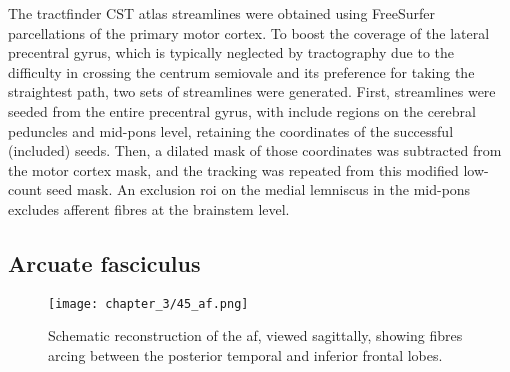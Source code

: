 The tractfinder CST atlas streamlines were obtained using FreeSurfer parcellations \autocite{Desikan2006,FischlSalat2002} of the primary motor cortex.
To boost the coverage of the lateral precentral gyrus,\autocite{Ebeling1992} which is typically neglected by tractography due to the difficulty in crossing the centrum semiovale and its preference for taking the straightest path, two sets of streamlines were generated.
First, streamlines were seeded from the entire precentral gyrus, with include regions on the cerebral peduncles and mid-pons level, retaining the coordinates of the successful (included) seeds.
Then, a dilated mask of those coordinates was subtracted from the motor cortex mask, and the tracking was repeated from this modified low-count seed mask.
An exclusion \gls{roi} on the medial lemniscus in the mid-pons excludes afferent fibres at the brainstem level.

\subsection{Arcuate fasciculus}

%

\begin{SCfigure}[][htb!]
  \texttt{[image: chapter\_3/45\_af.png]}
  \caption{Schematic reconstruction of the \gls{af}, viewed sagittally, showing fibres arcing between the posterior temporal and inferior frontal lobes.}
  \label{fig:af}
\end{SCfigure}

